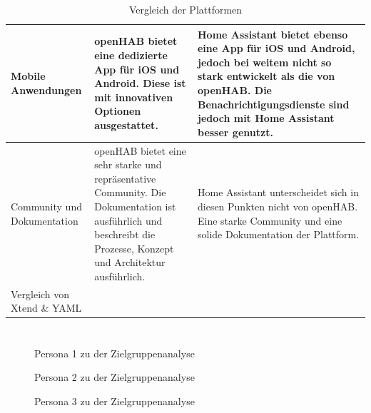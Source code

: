 \documentclass[
  ngerman           %
  ,twoside          %
  ,11pt
  ,pdftex
]{report}
\begin{document}
\begin{table}[hbt!]
\begin{center}
\begin{tabular}{| p{3.0cm} | p{6.2cm} | p{6.2cm} | }
          \hline
            Mobile Anwendungen & openHAB bietet eine dedizierte App für iOS und Android. Diese ist mit innovativen Optionen ausgestattet.  & Home Assistant bietet ebenso eine App für iOS und Android, jedoch bei weitem nicht so stark entwickelt als die von openHAB. Die Benachrichtigungsdienste sind jedoch mit Home Assistant besser genutzt. \\ 
          \hline
            Community und Dokumentation & openHAB bietet eine sehr starke und repräsentative Community. Die Dokumentation ist ausführlich und beschreibt die Prozesse, Konzept und Architektur ausführlich. & Home Assistant unterscheidet sich in diesen Punkten nicht von openHAB. Eine starke Community und eine solide Dokumentation der Plattform.  \\
          \hline
            Vergleich von Xtend \& YAML &  &  \\ 
          \hline 
      \end{tabular}
  \end{center}
  \caption{Vergleich der Plattformen \cite{sh-uni-comparison} \cite{msuttner-comparison} \cite{barclay-comparison}}
  \label{tab:comparisonTableHAOS-openHAB}
\end{table}

\chapter{}
\label{appendix:brandings}
\begin{figure}[hbt!]
\end{figure}

\chapter{}
\label{appendix:persona}
\pagebreak
\begin{figure}[hbt!]
  
  \caption{Persona 1 zu der Zielgruppenanalyse}
  \label{appendix:persona1}
\end{figure}
\pagebreak
\begin{figure}[hbt!]
  
  \caption{Persona 2 zu der Zielgruppenanalyse}
  \label{appendix:persona2}
\end{figure}
\pagebreak
\begin{figure}[hbt!]
  
  \caption{Persona 3 zu der Zielgruppenanalyse}
  \label{appendix:persona3}
\end{figure}




\end{document}
